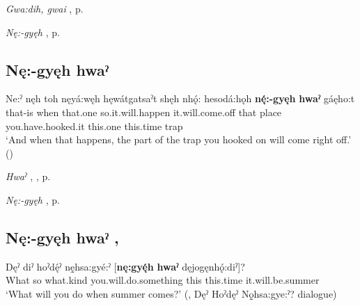 \begin{CayugaRelated}
\item \textit{Gwa:dih, gwai} , p. \pageref{p:[gwa:dih]}\\
\item \textit{Nę:-gyęh} , p. \pageref{p:[nę:-gyęh]}
\end{CayugaRelated}

\subsection*{\textbf{Nę:-gyęh hwaˀ} } \label{p:[nę:-gyęh hwaˀ] ‘this one’}

\ea
\label{ex:npar111}
\gll Ne:ˀ nęh toh nęyá:węh hęwátgatsaˀt shęh nhǫ́: hesodá:hǫh \textbf{nę́:-gyęh} \textbf{hwaˀ} gáęho:t\\
that-is when that.one so.it.will.happen it.will.come.off that place you.have.hooked.it this.one this.time trap\\
\glt ‘And when that happens, the part of the trap you hooked on will come right off.’ (\cite{mithun_how_1980})
\z

\begin{CayugaRelated}
\item \textit{Hwaˀ} , , p. \pageref{p:[hwaˀ]}\\
\item \textit{Nę:-gyęh}  , p. \pageref{p:[nę:-gyęh]}
\end{CayugaRelated}


\subsection*{\textbf{Nę:-gyęh hwaˀ} , } \label{p:[nę:-gyęh hwaˀ] ‘this time’}

\ea
\label{ex:npar112}
\gll Dęˀ diˀ hoˀdę́ˀ nę̱hsa:gyé:ˀ [\textbf{nę:gyę́h} \textbf{hwaˀ} dęjogęnhǫ́:diˀ]? \\
What so what.kind you.will.do.something this this.time it.will.be.summer\\
\glt ‘What will you do when summer comes?’ (\cite[349]{mithun_watewayestanih_1984}, Dęˀ Hoˀdęˀ Nǫ̱hsa:gye:ˀ? dialogue)
\z

